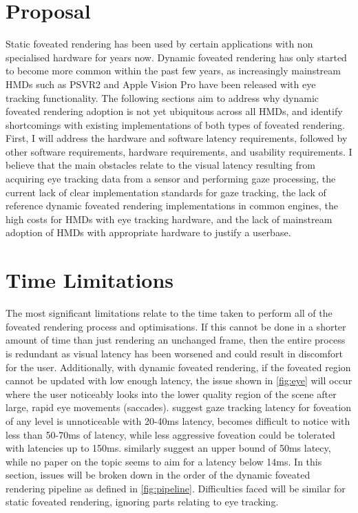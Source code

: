 \documentclass[a4paper,11pt]{article}
\begin{document}
\section{Proposal}
Static foveated rendering has been used by certain applications with non specialised hardware for years now. Dynamic foveated rendering has only started to become more common within the past few years, as increasingly mainstream HMDs such as PSVR2\cite{vr2_fove} and Apple Vision Pro\cite{vision_pro_announce} have been released with eye tracking functionality. The following sections aim to address why dynamic foveated rendering adoption is not yet ubiquitous across all HMDs, and identify shortcomings with existing implementations of both types of foveated rendering. First, I will address the hardware and software latency requirements, followed by other software requirements, hardware requirements, and usability requirements. I believe that the main obstacles relate to the visual latency resulting from acquiring eye tracking data from a sensor and performing gaze processing, the current lack of clear implementation standards for gaze tracking, the lack of reference dynamic foveated rendering implementations in common engines, the high costs for HMDs with eye tracking hardware, and the lack of mainstream adoption of HMDs with appropriate hardware to justify a userbase.

\section{Time Limitations}
The most significant limitations relate to the time taken to perform all of the foveated rendering process and optimisations. If this cannot be done in a shorter amount of time than just rendering an unchanged frame, then the entire process is redundant as visual latency has been worsened and could result in discomfort for the user. Additionally, with dynamic foveated rendering, if the foveated region cannot be updated with low enough latency, the issue shown in \cref{fig:eye} will occur where the user noticeably looks into the lower quality region of the scene after large, rapid eye movements (saccades). \textcite{albert2017latency} suggest gaze tracking latency for foveation of any level is unnoticeable with 20-40ms latency, becomes difficult to notice with less than 50-70ms of latency, while less aggressive foveation could be tolerated with latencies up to 150ms. \textcite{li2020optical} similarly suggest an upper bound of 50ms latecy, while no paper on the topic seems to aim for a latency below 14ms\cite{koskela2018instantaneous}. In this section, issues will be broken down in the order of the dynamic foveated rendering pipeline as defined in \cref{fig:pipeline}. Difficulties faced will be similar for static foveated rendering, ignoring parts relating to eye tracking.
\end{document}
